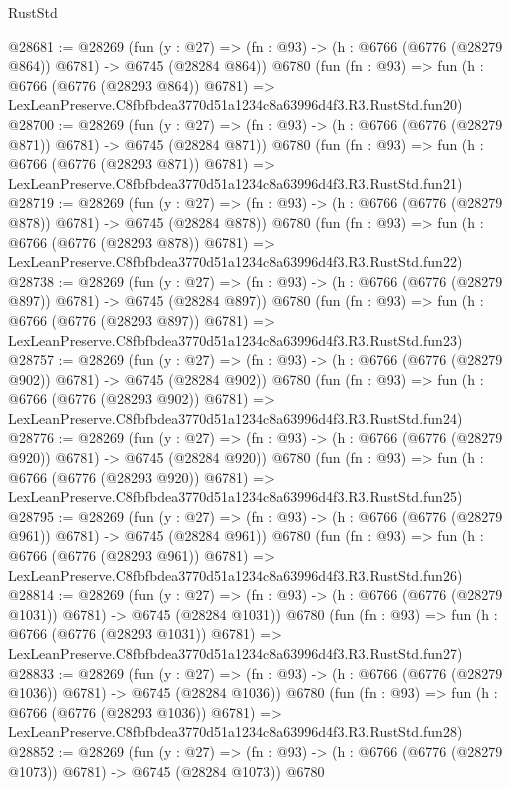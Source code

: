 \begin{lexlean}{RustStd}
\begin{coremodule}
@28681 := @28269
    (fun (y : @27) => (fn : @93) -> (h : @6766 (@6776 (@28279 @864)) @6781) -> @6745 (@28284 @864))
    @6780
    (fun (fn : @93) =>
    fun (h : @6766 (@6776 (@28293 @864)) @6781) =>
    LexLeanPreserve.C8fbfbdea3770d51a1234c8a63996d4f3.R3.RustStd.fun20)
@28700 := @28269
    (fun (y : @27) => (fn : @93) -> (h : @6766 (@6776 (@28279 @871)) @6781) -> @6745 (@28284 @871))
    @6780
    (fun (fn : @93) =>
    fun (h : @6766 (@6776 (@28293 @871)) @6781) =>
    LexLeanPreserve.C8fbfbdea3770d51a1234c8a63996d4f3.R3.RustStd.fun21)
@28719 := @28269
    (fun (y : @27) => (fn : @93) -> (h : @6766 (@6776 (@28279 @878)) @6781) -> @6745 (@28284 @878))
    @6780
    (fun (fn : @93) =>
    fun (h : @6766 (@6776 (@28293 @878)) @6781) =>
    LexLeanPreserve.C8fbfbdea3770d51a1234c8a63996d4f3.R3.RustStd.fun22)
@28738 := @28269
    (fun (y : @27) => (fn : @93) -> (h : @6766 (@6776 (@28279 @897)) @6781) -> @6745 (@28284 @897))
    @6780
    (fun (fn : @93) =>
    fun (h : @6766 (@6776 (@28293 @897)) @6781) =>
    LexLeanPreserve.C8fbfbdea3770d51a1234c8a63996d4f3.R3.RustStd.fun23)
@28757 := @28269
    (fun (y : @27) => (fn : @93) -> (h : @6766 (@6776 (@28279 @902)) @6781) -> @6745 (@28284 @902))
    @6780
    (fun (fn : @93) =>
    fun (h : @6766 (@6776 (@28293 @902)) @6781) =>
    LexLeanPreserve.C8fbfbdea3770d51a1234c8a63996d4f3.R3.RustStd.fun24)
@28776 := @28269
    (fun (y : @27) => (fn : @93) -> (h : @6766 (@6776 (@28279 @920)) @6781) -> @6745 (@28284 @920))
    @6780
    (fun (fn : @93) =>
    fun (h : @6766 (@6776 (@28293 @920)) @6781) =>
    LexLeanPreserve.C8fbfbdea3770d51a1234c8a63996d4f3.R3.RustStd.fun25)
@28795 := @28269
    (fun (y : @27) => (fn : @93) -> (h : @6766 (@6776 (@28279 @961)) @6781) -> @6745 (@28284 @961))
    @6780
    (fun (fn : @93) =>
    fun (h : @6766 (@6776 (@28293 @961)) @6781) =>
    LexLeanPreserve.C8fbfbdea3770d51a1234c8a63996d4f3.R3.RustStd.fun26)
@28814 := @28269
    (fun (y : @27) =>
    (fn : @93) -> (h : @6766 (@6776 (@28279 @1031)) @6781) -> @6745 (@28284 @1031))
    @6780
    (fun (fn : @93) =>
    fun (h : @6766 (@6776 (@28293 @1031)) @6781) =>
    LexLeanPreserve.C8fbfbdea3770d51a1234c8a63996d4f3.R3.RustStd.fun27)
@28833 := @28269
    (fun (y : @27) =>
    (fn : @93) -> (h : @6766 (@6776 (@28279 @1036)) @6781) -> @6745 (@28284 @1036))
    @6780
    (fun (fn : @93) =>
    fun (h : @6766 (@6776 (@28293 @1036)) @6781) =>
    LexLeanPreserve.C8fbfbdea3770d51a1234c8a63996d4f3.R3.RustStd.fun28)
@28852 := @28269
    (fun (y : @27) =>
    (fn : @93) -> (h : @6766 (@6776 (@28279 @1073)) @6781) -> @6745 (@28284 @1073))
    @6780

\end{coremodule}
\end{lexlean}
